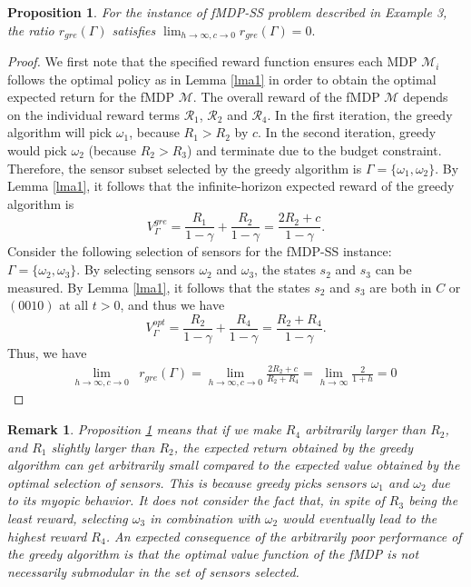 \documentclass[twocolumn]{autart}    %
\newtheorem{proposition}{Proposition}
\newtheorem{remark}{Remark}
\begin{document}
\begin{proposition}
\label{prop:1}
For the instance of fMDP-SS problem described in Example 3, the ratio $ r_{gre}(\Gamma)$ satisfies $\lim_{h \rightarrow \infty, c \rightarrow 0} r_{gre}(\Gamma) = 0.$
\end{proposition}
\begin{proof}
We first note that the specified reward function ensures each MDP $\mathcal{M}_i$ follows the optimal policy as in Lemma \ref{lma1} in order to obtain the optimal expected return for the fMDP $\mathcal{M}$. The overall reward of the fMDP $\mathcal{M}$ depends on the individual reward terms $\mathcal{R}_1$, $\mathcal{R}_2$ and $\mathcal{R}_4$. In the first iteration, the greedy algorithm will pick $\omega_1$, because $R_1 > R_2$ by $c$. In the second iteration, greedy would pick $\omega_2$ (because $R_2 > R_3$) and terminate due to the budget constraint. Therefore, the sensor subset selected by the greedy algorithm is $\Gamma = \{ \omega_1, \omega_2 \}$. By Lemma \ref{lma1}, it follows that the infinite-horizon expected reward of the greedy algorithm is 
\begin{equation}
\label{eq:gre}
    V_{\Gamma}^{gre} = \frac{R_1}{1-\gamma} + \frac{R_2}{1-\gamma}  = \frac{2R_2 + c}{1-\gamma}.
\end{equation}
Consider the following selection of sensors for the fMDP-SS instance:  $\Gamma = \{ \omega_2, \omega_3 \}$. By selecting sensors $\omega_2$ and $\omega_3$, the states $s_2 $ and $s_3$ can be measured. By Lemma \ref{lma1}, it follows that the states $s_2$ and $s_3$ are both in $C$ or $(0010)$ at all $t>0$, and thus we have
\begin{equation}
\label{eq:opt}
    V_{\Gamma}^{opt} = \frac{R_2}{1-\gamma} + \frac{R_4}{1-\gamma}  = \frac{R_2 + R_4}{1-\gamma}. 
\end{equation}
 Thus, we have 
\begin{equation*}
\begin{aligned}
    \lim_{h \rightarrow \infty, c \rightarrow 0} & r_{gre}(\Gamma) = \lim_{h \rightarrow \infty, c \rightarrow 0}  \frac{2R_2 + c}{R_2+R_4} =\lim_{h \rightarrow \infty}  \frac{2}{1+h} = 0 
\end{aligned}
\end{equation*} \end{proof}

\begin{remark}
    Proposition \ref{prop:1} means that if we make $R_4$ arbitrarily larger than $R_2$, and $R_1$ slightly larger than $R_2$, the expected return obtained by the greedy algorithm can get arbitrarily small compared to the expected value obtained by the optimal selection of sensors. This is because greedy picks sensors $\omega_1$ and $\omega_2$ due to its myopic behavior. It does not consider the fact that, in spite of $R_3$ being the least reward, selecting $\omega_3$ in combination with $\omega_2$ would eventually lead to the highest reward $R_4$. An expected consequence of the arbitrarily poor performance of the greedy algorithm is that the optimal value function of the fMDP is not necessarily submodular in the set of sensors selected.
\end{remark} 
\end{document}
